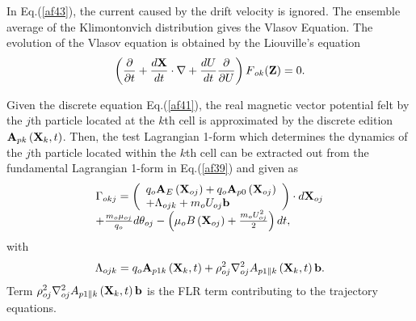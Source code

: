 \documentclass[12pt]{iopart}
\begin{document}
In Eq.(\ref{af43}), the current caused by the drift velocity is ignored.
The ensemble average of the Klimontonvich distribution gives the Vlasov Equation.
The evolution of the Vlasov equation is obtained by the Liouville's equation
\begin{equation}\label{af44}
\left( {\frac{\partial }{{\partial t}} + \frac{{d{{\bf{X}}}}}{{dt}}\cdot\nabla  + \frac{{d{U}}}{{dt}}\frac{\partial }{{\partial U}}} \right)F{_{ok}}(\mathbf{Z}) = 0.
\end{equation}

Given the discrete equation Eq.(\ref{af41}), the real magnetic vector potential felt by the $j$th particle located at the $k$th cell is approximated by the discrete edition ${{\bf{A}}_{pk}}\left( {{{\bf{X}}_k},t} \right)$. Then, the test Lagrangian 1-form which determines the dynamics of the $j$th particle located within the $k$th cell can be extracted out from the fundamental Lagrangian 1-form in Eq.(\ref{af39}) and given as
\begin{equation}\label{af45}
\begin{array}{l}
{\Gamma _{okj}} = \left( \begin{array}{l}
{q_o}{{\bf{A}}_E}\left( {{{\bf{X}}_{oj}}} \right) + {q_o}{{\bf{A}}_{p0}}\left( {{{\bf{X}}_{oj}}} \right)\\
 + {\Lambda _{ojk}} + {m_o}{U_{oj}}{\bf{b}}
\end{array} \right)\cdot d{{\bf{X}}_{oj}}\\
 + \frac{{{m_o}{\mu _{oj}}}}{{{q_o}}}d{\theta _{oj}} - \left( {{\mu _o}B\left( {{{\bf{X}}_{oj}}} \right) + \frac{{{m_o}U_{oj}^2}}{2}} \right)dt,
\end{array}
\end{equation}
with
\begin{equation}\label{af46}
{\Lambda _{ojk}} = {q_o}{{\bf{A}}_{p1k}}\left( {{{\bf{X}}_k},t} \right) + \rho _{oj}^2\nabla _{oj}^2{A_{p1\parallel k}}\left( {{{\bf{X}}_k},t} \right){\bf{b}}.
\end{equation}
Term $\rho _{oj}^2\nabla _{oj}^2{A_{p1\parallel k}}\left( {{{\bf{X}}_k},t} \right){\bf{b}}$ is the FLR term contributing to the trajectory equations.
\end{document}
